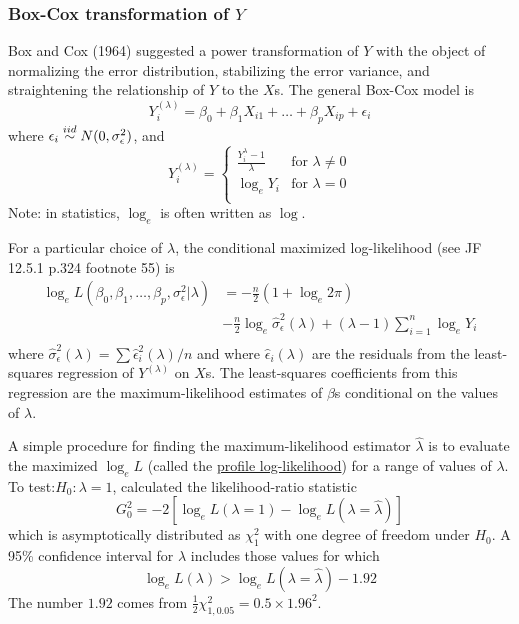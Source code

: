 \subsubsection*{Box-Cox transformation of $Y$}

Box and Cox (1964) suggested a power transformation of $Y$ with the object of normalizing the error distribution, stabilizing the error variance, and straightening the relationship of $Y$ to the $X$s.
The general Box-Cox model is
$$
Y_i^{(\lambda)} = \beta_0 + \beta_1 X_{i1} + \dots + \beta_p X_{ip} + \epsilon_i
$$
where $\epsilon_i \overset{iid}{\sim} N(0, \sigma_\epsilon^2)$, and 
$$
Y_i^{(\lambda)} = \left\{ \begin{array}{ll}  
\frac{Y_i^\lambda - 1}{\lambda} & \mbox{for } \lambda \ne 0\\
\log_e Y_i & \mbox{for } \lambda = 0\\
 \end{array} \right.
$$
Note: in statistics, $\log_e$ is often written as $\log$.

For a particular choice of $\lambda$, the conditional maximized log-likelihood (see JF 12.5.1 p.324 footnote 55) is
$$
\begin{aligned}
\log_e L(\beta_0, \beta_1, \dots, \beta_p, \sigma_\epsilon^2 | \lambda) &= - \frac{n}{2} (1 + \log_e 2\pi)  \\
&-\frac{n}{2}\log_e \hat{\sigma}_\epsilon^2(\lambda) + (\lambda - 1)\sum\limits_{i = 1}^n \log_e Y_i\\
\end{aligned}
$$
where $\hat{\sigma}_\epsilon^2(\lambda) = \sum \hat{\epsilon}_i^2(\lambda) / n$ and where $\hat{\epsilon}_i(\lambda)$ are the residuals from the least-squares regression of $Y^{(\lambda)}$ on $X$s.
The least-squares coefficients from this regression are the maximum-likelihood estimates of $\beta$s conditional on the values of $\lambda$.

A simple procedure for finding the maximum-likelihood estimator $\hat{\lambda}$ is to evaluate the maximized $\log_e L$ (called the \underline{profile log-likelihood}) for a range of values of $\lambda$.
To test:$H_0: \lambda = 1$, calculated the likelihood-ratio statistic
$$
G_0^2 = -2 [\log_e L(\lambda = 1) - \log_e L(\lambda = \hat{\lambda})]
$$
which is asymptotically distributed as $\chi^2_1$ with one degree of freedom under $H_0$.
A 95\% confidence interval for $\lambda$ includes those values for which
$$
\log_e L(\lambda) > \log_e L(\lambda = \hat{\lambda}) - 1.92
$$
The number $1.92$ comes from $\frac{1}{2}\chi^2_{1, 0.05} = 0.5 \times 1.96^2$.

